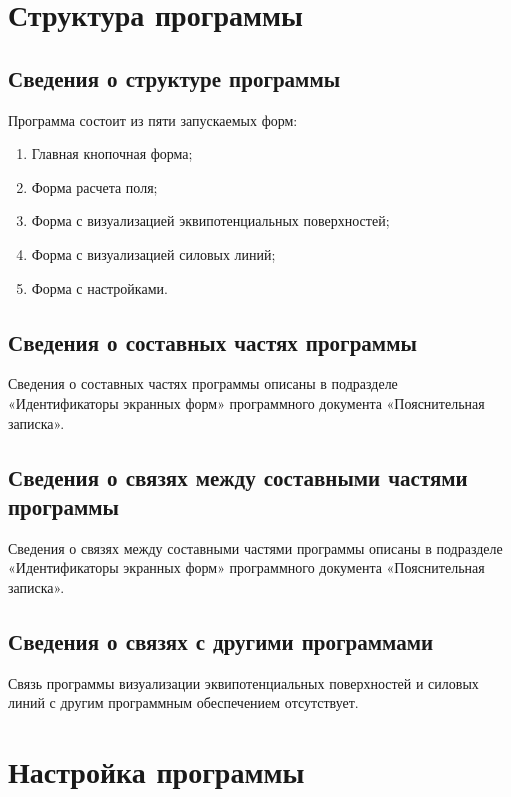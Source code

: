\documentclass[14pt,a4paper,final]{extreport}
\begin{document}
\chapter{Структура программы}

\section{Сведения о структуре программы}

Программа состоит из пяти запускаемых форм:

\begin{enumerate}
	\item Главная кнопочная форма;
	\item Форма расчета поля;
	\item Форма с визуализацией эквипотенциальных поверхностей;
	\item Форма с визуализацией силовых линий;
	\item Форма с настройками. 
\end{enumerate}

\section{Сведения о составных частях программы}

Сведения о составных частях программы описаны в подразделе «Идентификаторы экранных форм» программного документа «Пояснительная записка».

\section{Сведения о связях между составными частями программы}

Сведения о связях между составными частями программы описаны в подразделе «Идентификаторы экранных форм» программного документа «Пояснительная записка».

\section{Сведения о связях с другими программами}

Связь программы визуализации эквипотенциальных поверхностей и силовых линий с другим программным обеспечением отсутствует.

\chapter{Настройка программы}
\end{document}
